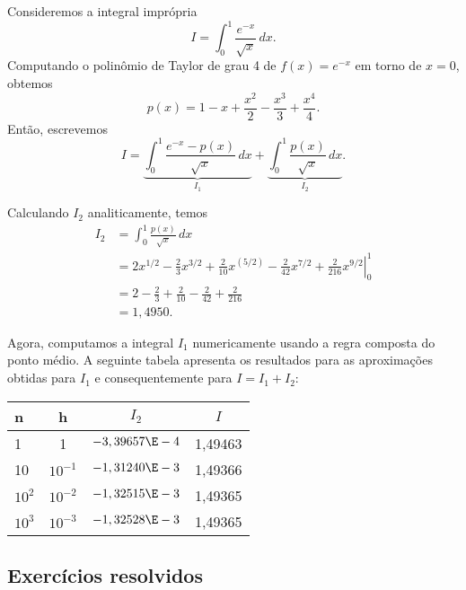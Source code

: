 \begin{ex}
  Consideremos a integral imprópria
  \begin{equation}
    I = \int_0^1 \frac{e^{-x}}{\sqrt{x}}\,dx.
  \end{equation}
Computando o polinômio de Taylor de grau 4 de $f(x) = e^{-x}$ em torno de $x=0$, obtemos
\begin{equation}
  p(x) = 1 - x + \frac{x^2}{2} - \frac{x^3}{3} + \frac{x^4}{4}.
\end{equation}
Então, escrevemos
\begin{equation}
  I = \underbrace{\int_0^1 \frac{e^{-x}-p(x)}{\sqrt{x}}\,dx}_{I_1} + \underbrace{\int_0^1 \frac{p(x)}{\sqrt{x}}\,dx}_{I_2}.
\end{equation}

Calculando $I_2$ analiticamente, temos
\begin{equation}
  \begin{split}
    I_2 &= \int_0^1 \frac{p(x)}{\sqrt{x}}\,dx\\
    &= \left.2x^{1/2} - \frac{2}{3}x^{3/2} + \frac{2}{10}x^{(5/2)} - \frac{2}{42}x^{7/2} + \frac{2}{216}x^{9/2} \right|_0^1\\
    &= 2 - \frac{2}{3} + \frac{2}{10} - \frac{2}{42} + \frac{2}{216}\\
    &= 1,4950.
  \end{split}
\end{equation}

Agora, computamos a integral $I_1$ numericamente usando a regra composta do ponto médio. A seguinte tabela apresenta os resultados para as aproximações obtidas para $I_1$ e consequentemente para $I = I_1 + I_2$:
\begin{center}
  \begin{tabular}{lc|c|c}\hline
    n      & h        & $I_2$ & $I$\\\hline
    1      & 1        & $-3,39657\E-4$ & 1,49463\\
    10     & $10^{-1}$ & $-1,31240\E-3$ & 1,49366\\
    $10^2$ & $10^{-2}$ & $-1,32515\E-3$ & 1,49365\\
    $10^3$ & $10^{-3}$ & $-1,32528\E-3$ & 1,49365\\\hline
  \end{tabular}
\end{center}
\end{ex}


\subsection*{Exercícios resolvidos}

